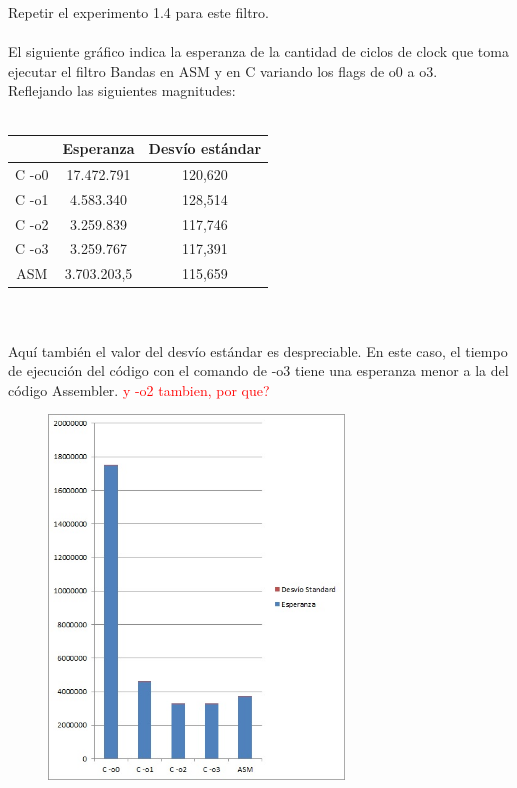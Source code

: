 Repetir el experimento 1.4 para este filtro. \\
\\
El siguiente gr\'afico indica la esperanza de la cantidad de ciclos de clock que toma ejecutar el filtro Bandas en ASM y en C variando los flags de o0 a o3. \\
Reflejando las siguientes magnitudes: \\
\\
 \begin{tabular}[c]{|c|c|c|}
	\hline
		 & Esperanza & Desv\'io est\'andar\\
		\hline
C -o0 & 17.472.791 & 120,620 \\
\hline
C -o1 & 4.583.340 & 128,514 \\
\hline
C -o2 & 3.259.839 & 117,746 \\
\hline
C -o3 & 3.259.767 & 117,391  \\
\hline
ASM & 3.703.203,5 & 115,659 \\
\hline
	\end{tabular}\\\\

Aqu\'i tambi\'en el valor del desv\'io est\'andar es despreciable. En este caso, el tiempo de ejecuci\'on del c\'odigo con el comando de -o3 tiene una esperanza menor a la del c\'odigo Assembler. \textcolor{red}{y -o2 tambien, por que?}

\begin{figure}[h!]
  \begin{center}
	\includegraphics[width=0.7\textwidth]{imagenes/32.jpg}
  \end{center}
\end{figure}


